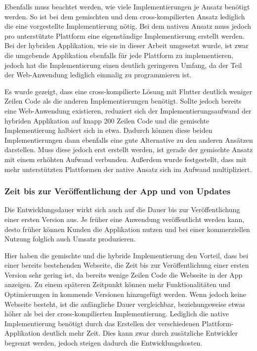 Ebenfalls muss beachtet werden, wie viele Implementierungen je Ansatz benötigt werden. So ist bei dem gemischten und dem cross-kompilierten Ansatz lediglich die eine vorgestellte Implementierung nötig. Bei dem nativen Ansatz muss jedoch pro unterstützte Plattform eine eigenständige Implementierung erstellt werden. Bei der hybriden Applikation, wie sie in dieser Arbeit umgesetzt wurde, ist zwar die umgebende Applikation ebenfalls für jede Plattform zu implementieren, jedoch hat die Implementierung einen deutlich geringeren Umfang, da der Teil der Web-Anwendung lediglich einmalig zu programmieren ist.  

Es wurde gezeigt, dass eine cross-kompilierte Lösung mit Flutter deutlich weniger Zeilen Code als die anderen Implementierungen benötigt.
Sollte jedoch bereits eine Web-Anwendung existieren, reduziert sich der Implementierungsaufwand der hybriden Applikation auf knapp 200 Zeilen Code und die gemischte Implementierung halbiert sich in etwa. Dadurch können diese beiden Implementierungen dann ebenfalls eine gute Alternative zu den anderen Ansätzen darstellen. Muss diese jedoch erst erstellt werden, ist gerade der gemischte Ansatz mit einem erhöhten Aufwand verbunden. Außerdem wurde festgestellt, dass mit mehr unterstützten Plattformen der native Ansatz sich im Aufwand multipliziert.

\subsubsection{Zeit bis zur Veröffentlichung der App und von Updates }
Die Entwicklungsdauer wirkt sich auch auf die Dauer bis zur Veröffentlichung einer ersten Version aus.
Je früher eine Anwendung veröffentlicht werden kann, desto früher können Kunden die Applikation nutzen und bei einer kommerziellen Nutzung folglich auch Umsatz produzieren.

Hier haben die gemischte und die hybride Implementierung den Vorteil, dass bei einer bereits bestehenden Webseite, die Zeit bis zur Veröffentlichung einer ersten Version sehr gering ist, da bereits wenige Zeilen Code die Webseite in der App anzeigen. Zu einem späteren Zeitpunkt können mehr Funktionalitäten und Optimierungen in kommende Versionen hinzugefügt werden. Wenn jedoch keine Webseite besteht, ist die anfängliche Dauer vergleichbar, beziehungsweise etwas höher als bei der cross-kompilierten Implementierung. Lediglich die native Implementierung benötigt durch das Erstellen der verschiedenen Plattform-Applikation deutlich mehr Zeit. Dies kann zwar durch zusätzliche Entwickler begrenzt werden, jedoch steigen dadurch die Entwicklungskosten.

